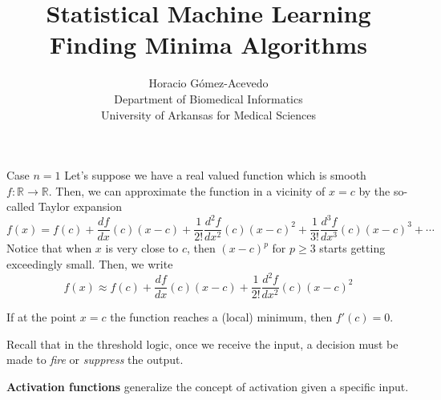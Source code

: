 \documentclass{beamer}
\title{Statistical Machine Learning\\ Finding Minima Algorithms}
\author{Horacio G\'omez-Acevedo\\ Department of Biomedical Informatics\\
	University of Arkansas for Medical Sciences}
\begin{document}
	\begin{frame}[plain]
		\maketitle
	\end{frame}
	
	\begin{frame}{Case $n=1$}
		Let's suppose we have a real valued function which is smooth $f\colon \mathbb{R}\to \mathbb{R}$. Then, we can approximate the function in a vicinity of $x=c$ by the so-called Taylor expansion
		\begin{equation*}
			f(x)= f(c)+ \frac{df}{dx}(c) (x-c)+  \frac{1}{2!} \frac{d^2f}{dx^2}(c) (x-c)^2 +  \frac{1}{3!} \frac{d^3f}{dx^3}(c) (x-c)^3+ \cdots
		\end{equation*}
		Notice that when $x$ is very close to $c$, then $(x-c)^p$ for $p\ge 3$ starts getting exceedingly small. Then, we write 
			\begin{equation*}
			f(x) \approx f(c)+ \frac{df}{dx}(c) (x-c)+  \frac{1}{2!} \frac{d^2f}{dx^2}(c) (x-c)^2 
		\end{equation*}
		
		If at the point $x=c$ the function reaches a (local) minimum, then $f'(c)=0$.
		
		Recall that in the threshold logic,  once we receive the input, a decision must be made to \textit{fire} or \textit{suppress} the output. 
		
		
		\textbf{Activation functions} generalize the concept of activation given a specific  input.
		
		
	\end{frame}
\end{document}

